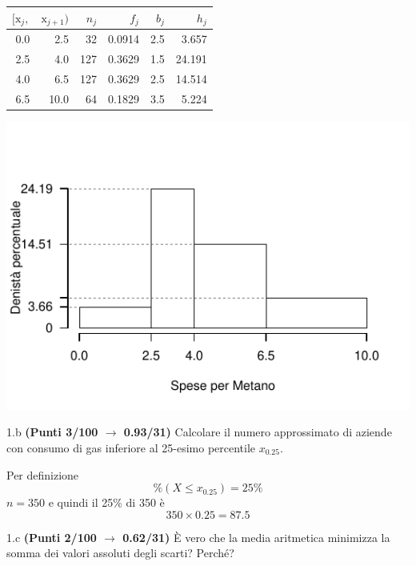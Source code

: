 \documentclass[
  11pt,
]{book}
\theoremstyle{mytheoremstyle}
\theoremstyle{mydefstyle}
\newenvironment{sol}
  {
  \begin{tcolorbox}[enhanced,breakable,arc=0.1mm,boxrule=1pt,colback=white,colframe=iblue,
  title=\bf \fontfamily{lmss}\selectfont \hspace{.5 cm} Soluzione,drop fuzzy shadow]

}{
\end{tcolorbox}
  }
\begin{document}
\begin{sol}

\begin{table}[H]
\centering
\begin{tabular}{rrrrrr}
\toprule
$[\text{x}_j,$ & $\text{x}_{j+1})$ & $n_j$ & $f_j$ & $b_j$ & $h_j$\\
\midrule
0.0 & 2.5 & 32 & 0.0914 & 2.5 & 3.657\\
2.5 & 4.0 & 127 & 0.3629 & 1.5 & 24.191\\
4.0 & 6.5 & 127 & 0.3629 & 2.5 & 14.514\\
6.5 & 10.0 & 64 & 0.1829 & 3.5 & 5.224\\
\bottomrule
\end{tabular}
\end{table}

\begin{center}\includegraphics{Esami_passati_con_soluzioni_files/figure-latex/2021-79-1} \end{center}

\end{sol}

1.b \textbf{(Punti 3/100 \(\rightarrow\) 0.93/31)} Calcolare il numero approssimato di aziende con consumo di gas inferiore al 25-esimo percentile \(x_{0.25}\).

\begin{sol}
Per definizione
\[
\%(X\le x_{0.25})=25\%
\]
\(n=350\) e quindi il 25\% di 350 è
\[
350\times0.25=87.5
\]

\end{sol}

1.c \textbf{(Punti 2/100 \(\rightarrow\) 0.62/31)} È vero che la media aritmetica minimizza la somma dei valori assoluti degli scarti? Perché?
\end{document}
